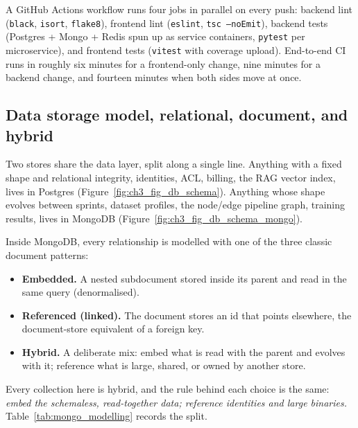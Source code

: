 \documentclass[12pt, a4paper, oneside]{report}
\begin{document}
A GitHub Actions workflow runs four jobs in parallel on every push:
backend lint (\texttt{black}, \texttt{isort}, \texttt{flake8}),
frontend lint (\texttt{eslint}, \texttt{tsc --noEmit}), backend
tests (Postgres + Mongo + Redis spun up as service containers,
\texttt{pytest} per microservice), and frontend tests
(\texttt{vitest} with coverage upload). End-to-end CI runs in
roughly six minutes for a frontend-only change, nine minutes for a
backend change, and fourteen minutes when both sides move at once.

\subsection{Data storage model, relational, document, and hybrid}

Two stores share the data layer, split along a single line. Anything
with a fixed shape and relational integrity, identities, ACL,
billing, the RAG vector index, lives in Postgres
(Figure~\ref{fig:ch3_fig_db_schema}). Anything whose shape evolves
between sprints, dataset profiles, the node/edge pipeline graph,
training results, lives in MongoDB
(Figure~\ref{fig:ch3_fig_db_schema_mongo}).

Inside MongoDB, every relationship is modelled with one of the three
classic document patterns:

\begin{itemize}
  \item \textbf{Embedded.} A nested subdocument stored inside its
      parent and read in the same query (denormalised).
  \item \textbf{Referenced (linked).} The document stores an id that
      points elsewhere, the document-store equivalent of a foreign
      key.
  \item \textbf{Hybrid.} A deliberate mix: embed what is read with the
      parent and evolves with it; reference what is large, shared, or
      owned by another store.
\end{itemize}

Every collection here is hybrid, and the rule behind each choice is the
same: \emph{embed the schemaless, read-together data; reference
identities and large binaries.}
Table~\ref{tab:mongo_modelling} records the split.
\end{document}
